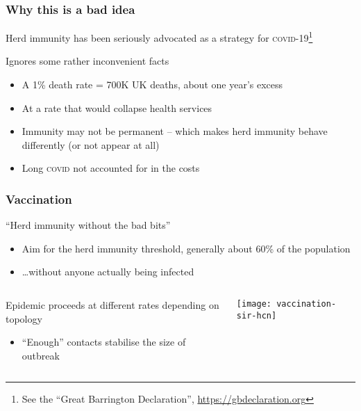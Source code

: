\documentclass{beamer}
\begin{document}
\begin{frame}
  \frametitle{Why this is a bad idea}

  \begin{block}{Herd immunity has been seriously advocated as a
      strategy for \textsc{covid-19}\footnote{See the ``Great
        Barrington Declaration'', \url{https://gbdeclaration.org}}}
  \end{block}

  \begin{block}{Ignores some rather inconvenient facts}
    \begin{itemize}
    \item A 1\% death rate = 700K UK deaths, about one year's excess
    \item At a rate that would collapse health services
    \item Immunity may not be permanent -- which makes herd immunity
      behave differently (or not appear at all)
    \item Long \textsc{covid} not accounted for in the costs
    \end{itemize}
  \end{block}
\end{frame}

\begin{frame}
  \frametitle{Vaccination}

  \begin{block}{``Herd immunity without the bad bits''}
    \begin{itemize}
    \item Aim for the herd immunity threshold, generally about 60\% of
      the population
    \item \ldots without anyone actually being infected
    \end{itemize}
  \end{block}
  
  \begin{columns}
    \begin{column}[c]{.65\textwidth}
      \begin{block}{Epidemic proceeds at different rates depending on
          topology}
        \begin{itemize}
        \item ``Enough'' contacts stabilise the size of outbreak 
        \end{itemize}
      \end{block}

    \end{column}
    \begin{column}[c]{.35\textwidth}
       \texttt{[image: vaccination-sir-hcn]}
    \end{column}
  \end{columns}
\end{frame}
\end{document}
